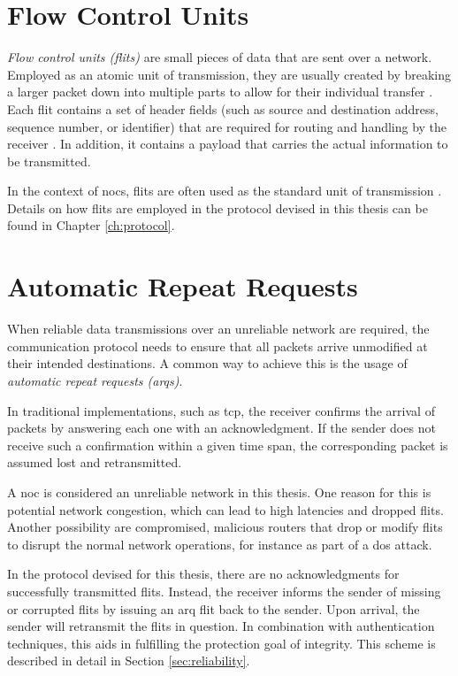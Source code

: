 \section{Flow Control Units}\label{sec:flitsfun}
\textit{Flow control units (flits)} are small pieces of data that are sent over a network. Employed as an atomic unit of transmission, they are
usually created by breaking a larger
packet down into multiple parts to allow for their individual transfer \cite[6]{flitslecturecmu}. Each flit contains a set of header fields (such as source and
destination address, sequence number, or identifier) that are required for routing and handling by the receiver \cite[2]{flitslectureutah}.
In addition, it contains a payload that carries the actual information to be transmitted.

In the context of \glspl{noc}, flits are often used as the standard unit of transmission \cite[51\psqq]{tatas16designingnocs}. Details on how flits
are employed in the protocol devised in this thesis can be found in Chapter \ref{ch:protocol}.

\section{Automatic Repeat Requests}\label{sec:arqs}
When reliable data transmissions over an unreliable network are required, the communication protocol needs to ensure that all packets arrive unmodified
at their intended destinations. A common way to achieve this is the usage of \textit{automatic repeat requests (\glspl{arq})}.

In traditional implementations, such as \gls{tcp}, the receiver confirms the arrival of packets by answering each one with an acknowledgment.
If the sender does not receive such a confirmation within a given time span, the corresponding packet is assumed lost and retransmitted.

A \gls{noc} is considered an unreliable network in this thesis. One reason for this is potential network congestion, which can lead to high latencies
and dropped flits. Another possibility are compromised, malicious routers that drop or modify flits to disrupt the normal network operations, for
instance as part of a \gls{dos} attack.

In the protocol devised for this thesis, there are no acknowledgments for successfully transmitted flits. Instead, the receiver informs the sender of missing or corrupted
flits by issuing an \gls{arq} flit back to the sender. Upon arrival, the sender will retransmit the flits in question. In combination with
authentication techniques, this aids in fulfilling the protection goal of integrity. This scheme is described in detail in Section
\ref{sec:reliability}.

